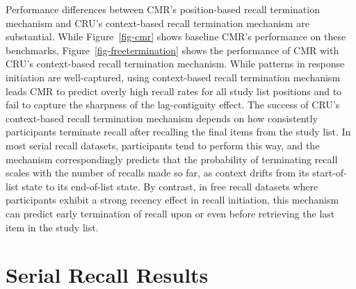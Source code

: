 \documentclass[
  man,
  floatsintext,
  longtable,
  nolmodern,
  notxfonts,
  notimes,
  draftfirst,
  colorlinks=true,linkcolor=blue,citecolor=blue,urlcolor=blue]{apa7}
\begin{document}
Performance differences between CMR's position-based recall termination
mechanism and CRU's context-based recall termination mechanism are
substantial. While Figure~\ref{fig-cmr} shows baseline CMR's performance
on these benchmarks, Figure~\ref{fig-freetermination} shows the
performance of CMR with CRU's context-based recall termination
mechanism. While patterns in response initiation are well-captured,
using context-based recall termination mechanism leads CMR to predict
overly high recall rates for all study list positions and to fail to
capture the sharpness of the lag-contiguity effect. The success of CRU's
context-based recall termination mechanism depends on how consistently
participants terminate recall after recalling the final items from the
study list. In most serial recall datasets, participants tend to perform
this way, and the mechanism correspondingly predicts that the
probability of terminating recall scales with the number of recalls made
so far, as context drifts from its start-of-list state to its
end-of-list state. By contrast, in free recall datasets where
participants exhibit a strong recency effect in recall initiation, this
mechanism can predict early termination of recall upon or even before
retrieving the last item in the study list.

\section{Serial Recall Results}\label{serial-recall-results}
\end{document}
